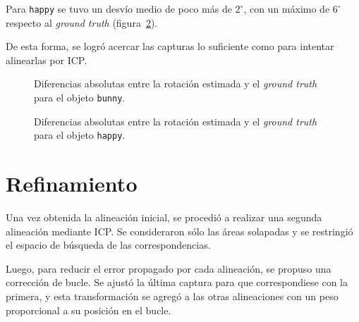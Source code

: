 			Para \texttt{happy} se tuvo un desvío medio de poco más de
			$2^{\circ}$, con un máximo de $6^{\circ}$ respecto al \emph{ground truth} (figura~\ref{fig:clust_happy}).

			De esta forma, se logró acercar las capturas lo suficiente como
			para intentar alinearlas por ICP.

		\begin{figure}
			\caption{\label{fig:clust_bunny}Diferencias absolutas entre la rotación estimada y el \emph{ground truth} para el objeto \texttt{bunny}.}
		\end{figure}

		\begin{figure}
			\caption{\label{fig:clust_happy}Diferencias absolutas entre la rotación estimada y el \emph{ground truth} para el objeto \texttt{happy}.}
		\end{figure}


	\section{Refinamiento}
	Una vez obtenida la alineación inicial, se procedió a realizar una segunda
	alineación mediante ICP.
	Se consideraron sólo las áreas solapadas y se restringió el
	espacio de búsqueda de las correspondencias.

	Luego, para reducir el error propagado por cada alineación, se propuso una
	corrección de bucle.
	Se ajustó la última captura para que correspondiese con la primera, y
	esta transformación se agregó a las otras alineaciones con un peso
	proporcional a su posición en el bucle.



